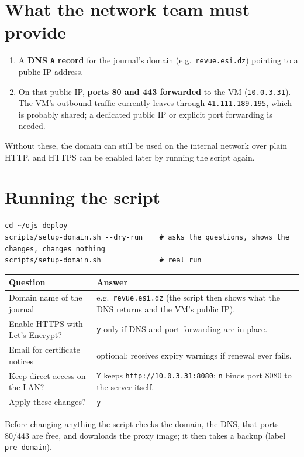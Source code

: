 \documentclass[11pt,a4paper]{report}
\newcommand{\code}[1]{\texttt{\small #1}}
\begin{document}
\section{What the network team must provide}
\begin{enumerate}
  \item A \textbf{DNS \code{A} record} for the journal's domain (e.g.\ \code{revue.esi.dz}) pointing to a
        public IP address.
  \item On that public IP, \textbf{ports 80 and 443 forwarded} to the VM (\code{10.0.3.31}). The VM's
        outbound traffic currently leaves through \code{41.111.189.195}, which is probably shared;
        a dedicated public IP or explicit port forwarding is needed.
\end{enumerate}
Without these, the domain can still be used on the internal network over plain HTTP, and HTTPS
can be enabled later by running the script again.

\section{Running the script}
\begin{lstlisting}
cd ~/ojs-deploy
scripts/setup-domain.sh --dry-run    # asks the questions, shows the changes, changes nothing
scripts/setup-domain.sh              # real run
\end{lstlisting}
\begin{tabularx}{\linewidth}{@{}P{5.4cm}L@{}}
\toprule
\textbf{Question} & \textbf{Answer} \\
\midrule
Domain name of the journal         & e.g.\ \code{revue.esi.dz} (the script then shows what the DNS returns and the VM's public IP). \\
Enable HTTPS with Let's Encrypt?   & \code{y} only if DNS and port forwarding are in place. \\
Email for certificate notices      & optional; receives expiry warnings if renewal ever fails. \\
Keep direct access on the LAN?     & \code{Y} keeps \code{http://10.0.3.31:8080}; \code{n} binds port 8080 to the server itself. \\
Apply these changes?               & \code{y} \\
\bottomrule
\end{tabularx}

Before changing anything the script checks the domain, the DNS, that ports 80/443 are free, and
downloads the proxy image; it then takes a backup (label \code{pre-domain}).
\end{document}
